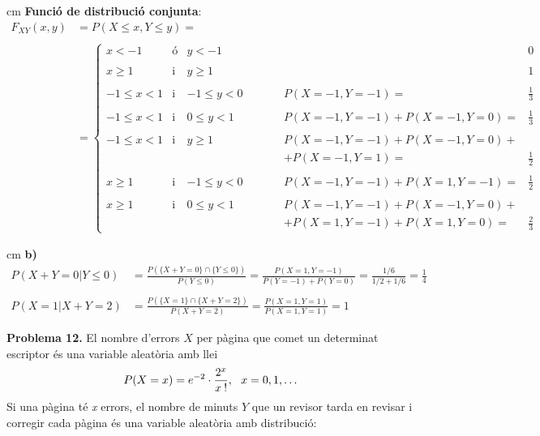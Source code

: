 \documentclass{article}
\begin{document}
 cm
\noindent
\textbf{Funci\'o de distribuci\'o conjunta}: 
\[
\begin{array}{rl}
F_{XY}(x, y)& = P(X \leq x, Y \leq y)=\\ \\
 & = 
\left\{ 
\begin{array}{ccccll}
x < -1 & \text{\'o} & y < -1 & \qquad & & 0 \\ \\
x \geq 1 & \text{i} & y \geq 1 & \qquad & & 1 \\ \\
-1 \leq x < 1 & \text{i} & -1 \leq y < 0 & \qquad & P(X=-1, Y=-1)=&\frac{1}{3}\\ \\
-1 \leq x < 1 & \text{i} & 0 \leq y < 1 & \qquad & P(X=-1, Y=-1)+P(X=-1, Y=0)=& \frac{1}{3}\\ \\
-1 \leq x < 1 & \text{i} &  y \geq 1 & \qquad & P(X=-1, Y=-1)+P(X=-1, Y=0)+ & \\
              &          &           & \qquad & +P(X=-1, Y=1)=& \frac{1}{2}\\ \\
x \geq 1 & \text{i} & -1 \leq y < 0 & \qquad & P(X=-1, Y=-1)+P(X=1, Y=-1)=& \frac{1}{2}\\ \\
x \geq 1 & \text{i} & 0 \leq y < 1 & \qquad & P(X=-1, Y=-1)+P(X=-1, Y=0)+ & \\
         &          &              & \qquad & +P(X=1, Y=-1)+P(X=1, Y=0)= & \frac{2}{3}
\end{array}
\right.
\end{array}
\]

 cm
\noindent
\textbf{b)} 
\[
\begin{array}{ll}
P(X+Y=0 |Y \leq 0)&=\frac{P(\{X+Y =0\} \cap \{Y \leq 0\})}{P(Y \leq 0)}=\frac{P(X=1, Y=-1)}{P(Y=-1)+P(Y=0)}=
\frac{1/6}{1/2+1/6}=\frac{1}{4}
\\ 
\\
P(X=1 | X+Y=2)&=\frac{ P(\{X=1\} \cap \{X+Y=2\})}{P(X+Y=2)}=\frac{P(X=1,Y=1)}{P(X=1, Y=1)}=1
\end{array}
\]


\newpage
\noindent
\textbf{Problema 12.} 
El nombre d'errors $X$ per p\`agina que comet un determinat
escriptor \'es una variable aleat\`oria amb llei 
\[
P(X = x) = e^{-2} \cdot {2^x \over x \> !}, \ \ x = 0,1, \ldots
\]
\noindent
Si una p\`agina t\'e {\it x} errors, el nombre de minuts $Y$ que un revisor tarda en
revisar i corregir cada p\`agina \'es una variable aleat\`oria amb
distribuci\'o:
\end{document}
